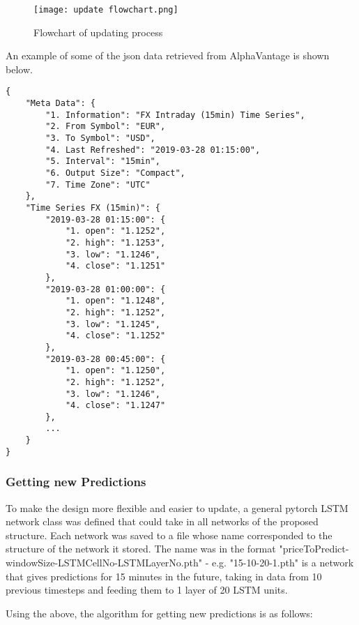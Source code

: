             \begin{figure}[h]
                \centering
                \texttt{[image: update flowchart.png]}
                \caption{Flowchart of updating process}
                \label{fig:update_flowchart}
            \end{figure}
            
            An example of some of the json data retrieved from AlphaVantage is shown below. 

            \begin{verbatim}
{
    "Meta Data": {
        "1. Information": "FX Intraday (15min) Time Series",
        "2. From Symbol": "EUR",
        "3. To Symbol": "USD",
        "4. Last Refreshed": "2019-03-28 01:15:00",
        "5. Interval": "15min",
        "6. Output Size": "Compact",
        "7. Time Zone": "UTC"
    },
    "Time Series FX (15min)": {
        "2019-03-28 01:15:00": {
            "1. open": "1.1252",
            "2. high": "1.1253",
            "3. low": "1.1246",
            "4. close": "1.1251"
        },
        "2019-03-28 01:00:00": {
            "1. open": "1.1248",
            "2. high": "1.1252",
            "3. low": "1.1245",
            "4. close": "1.1252"
        },
        "2019-03-28 00:45:00": {
            "1. open": "1.1250",
            "2. high": "1.1252",
            "3. low": "1.1246",
            "4. close": "1.1247"
        },
        ...
    }
}
            \end{verbatim}

            \subsubsection{Getting new Predictions}
        
            To make the design more flexible and easier to update, a general pytorch LSTM network class was defined that could take in all networks of the proposed structure. Each network was saved to a file whose name corresponded to the structure of the network it stored. The name was in the format "priceToPredict-windowSize-LSTMCellNo-LSTMLayerNo.pth" - e.g. "15-10-20-1.pth" is a network that gives predictions for 15 minutes in the future, taking in data from 10 previous timesteps and feeding them to 1 layer of 20 LSTM units. 

            Using the above, the algorithm for getting new predictions is as follows:


